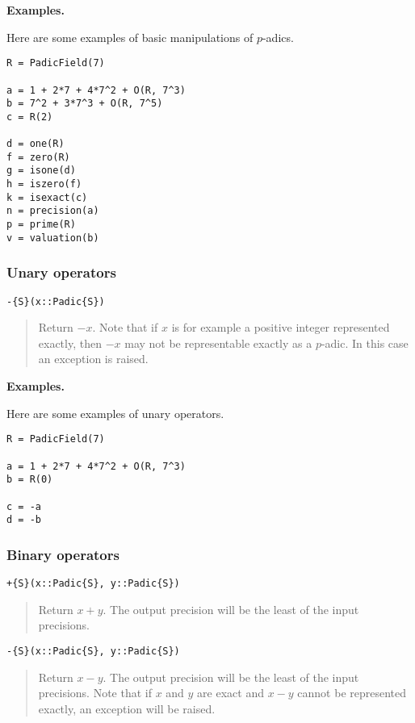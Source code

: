 \documentclass[a4paper,10pt]{article}
\newcommand{\desc}[1]{\vspace{-3mm}\begin{quote}#1\end{quote}}
\begin{document}
{{\textbf{Examples.}

Here are some examples of basic manipulations of $p$-adics.

\begin{lstlisting}
R = PadicField(7)

a = 1 + 2*7 + 4*7^2 + O(R, 7^3)
b = 7^2 + 3*7^3 + O(R, 7^5)
c = R(2)

d = one(R)
f = zero(R)
g = isone(d)
h = iszero(f)
k = isexact(c)
n = precision(a)
p = prime(R)
v = valuation(b)
\end{lstlisting}

\subsubsection{Unary operators}

\begin{lstlisting}
-{S}(x::Padic{S})
\end{lstlisting}

\desc{Return $-x$. Note that if $x$ is for example a positive integer
represented exactly, then $-x$ may not be representable exactly as a $p$-adic.
In this case an exception is raised.}

\textbf{Examples.}

Here are some examples of unary operators.

\begin{lstlisting}
R = PadicField(7)

a = 1 + 2*7 + 4*7^2 + O(R, 7^3)
b = R(0)

c = -a
d = -b
\end{lstlisting}

\subsubsection{Binary operators}

\begin{lstlisting}
+{S}(x::Padic{S}, y::Padic{S})
\end{lstlisting}

\desc{Return $x + y$. The output precision will be the least of the input
precisions.}

\begin{lstlisting}
-{S}(x::Padic{S}, y::Padic{S})
\end{lstlisting}

\desc{Return $x - y$. The output precision will be the least of the input
precisions. Note that if $x$ and $y$ are exact and $x - y$ cannot be
represented exactly, an exception will be raised.}

}}
\end{document}
